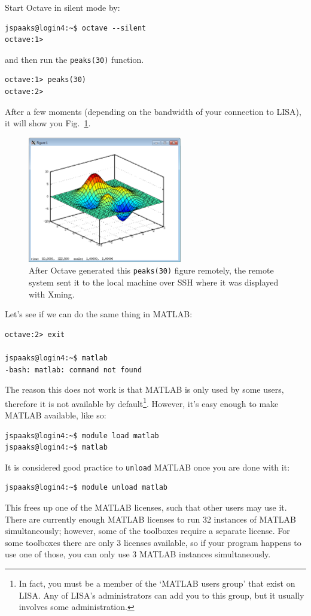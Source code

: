Start Octave in silent mode by:
\begin{lstlisting}[style=basic,style=bash]
jspaaks@login4:~$ octave --silent
octave:1> 
\end{lstlisting}
and then run the \lstinline[style=bashinline]{peaks(30)} function.
\begin{lstlisting}[style=basic,style=bash]
octave:1> peaks(30)
octave:2>
\end{lstlisting}
After a few moments (depending on the bandwidth of your connection to LISA), it will show you Fig.~\ref{fig:octave-peaks-x-forwarding}.
\begin{figure}[!htb]
  \centering
    \includegraphics[width=0.6\textwidth]{./../eps/octave-peaks-x-forwarding.eps}
  \caption{After Octave generated this \lstinline[style=bashinline]{peaks(30)} figure remotely, the remote system sent it to the local machine over SSH where it was displayed with Xming.}
  \label{fig:octave-peaks-x-forwarding}
\end{figure}


\needspace{4em}
Let's see if we can do the same thing in MATLAB:
\begin{lstlisting}[style=basic,style=bash]
octave:2> exit

jspaaks@login4:~$ matlab
-bash: matlab: command not found
\end{lstlisting}
The reason this does not work is that MATLAB is only used by some users, therefore it is not available by default\footnote{In fact, you must be a member of the `MATLAB users group' that exist on LISA. Any of LISA's administrators can add you to this group, but it usually involves some administration.}. However, it's easy enough to make MATLAB available, like so:  
\begin{lstlisting}[style=basic,style=bash]
jspaaks@login4:~$ module load matlab
jspaaks@login4:~$ matlab 
\end{lstlisting}
It is considered good practice to \lstinline[style=bashinline]{unload} MATLAB once you are done with it:
\begin{lstlisting}[style=basic,style=bash]
jspaaks@login4:~$ module unload matlab
\end{lstlisting}
This frees up one of the MATLAB licenses, such that other users may use it. There are currently enough MATLAB licenses to run 32 instances of MATLAB simultaneously; however, some of the toolboxes require a separate license. For some toolboxes there are only 3 licenses available, so if your program happens to use one of those, you can only use 3 MATLAB instances simultaneously. 

